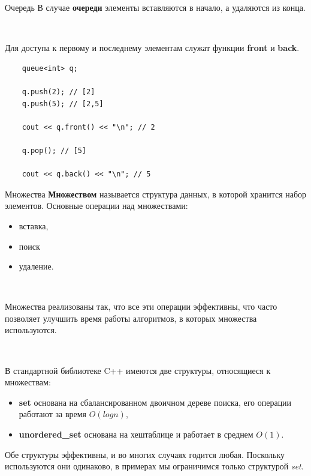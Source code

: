 \documentclass{beamer}
\begin{document}
\begin{frame}[fragile]{Очередь}
    В случае \textbf{очереди} элементы вставляются в начало, а удаляются из конца.
    
    ~
    
    Для доступа к первому и последнему элементам служат функции \textbf{front} и \textbf{back}.
    
    \begin{verbatim}
    queue<int> q;
    
    q.push(2); // [2]
    q.push(5); // [2,5]
    
    cout << q.front() << "\n"; // 2
    
    q.pop(); // [5]
    
    cout << q.back() << "\n"; // 5
    \end{verbatim}
\end{frame}

\begin{frame}[fragile]{Множества}
    \textbf{Множеством} называется структура данных, в которой хранится набор элементов. Основные операции над множествами:
    \begin{itemize}
        \item вставка, 
        \item поиск
        \item удаление.
    \end{itemize}
    
    ~
    
    Множества реализованы так, что все эти операции эффективны, что часто позволяет улучшить время работы алгоритмов, в которых множества используются.

    ~
    
    В стандартной библиотеке C++ имеются две структуры, относящиеся к множествам:
    \begin{itemize}
        \item \textbf{set} основана на сбалансированном двоичном дереве поиска, его операции работают за время $O(log n)$, 
        \item \textbf{unordered\_set} основана на хеш­таблице и работает в среднем $O(1)$.
    \end{itemize}

    Обе структуры эффективны, и во многих случаях годится любая. Поскольку используются они одинаково, в примерах мы ограничимся только структурой \textit{set}.
\end{frame}
\end{document}
